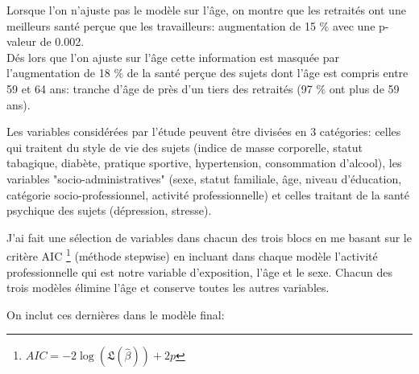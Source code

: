 \documentclass{book}
\begin{document}
\begin{longtable}{lccc|ccc}
 
    \hline
    \end{longtable} 

\noindent
Lorsque l'on n'ajuste pas le modèle sur l'âge, on montre que les retraités ont une meilleurs santé perçue que les travailleurs: augmentation de 15 $\%$ avec une p-valeur de 0.002.\\
Dés lors que l'on ajuste sur l'âge cette information est masquée par l'augmentation de 18 $\%$ de la santé perçue des sujets dont l'âge est compris entre 59 et 64 ans: tranche d'âge de près d'un tiers des retraités (97 $\%$ ont plus de 59 ans).

\bigskip

\noindent
Les variables considérées par l'étude peuvent être divisées en 3 catégories: celles qui traitent du style de vie des sujets (indice de masse corporelle, statut tabagique, diabète, pratique sportive, hypertension, consommation d'alcool), les variables "socio-administratives" (sexe, statut familiale, âge, niveau d'éducation, catégorie socio-professionnel, activité professionnelle) et celles traitant de la santé psychique des sujets (dépression, stresse).

\bigskip

\noindent
J'ai fait une sélection de variables dans chacun des trois blocs en me basant sur le critère AIC \footnote{$AIC = -2 \log \left( \mathfrak{L} (\hat{\beta}) \right) + 2p $} (méthode stepwise) en incluant dans chaque modèle l'activité professionnelle qui est notre variable d'exposition, l'âge et le sexe. Chacun des trois modèles élimine l'âge et conserve toutes les autres variables.

\bigskip

\noindent
On inclut ces dernières dans le modèle final:

\newpage
\end{document}
